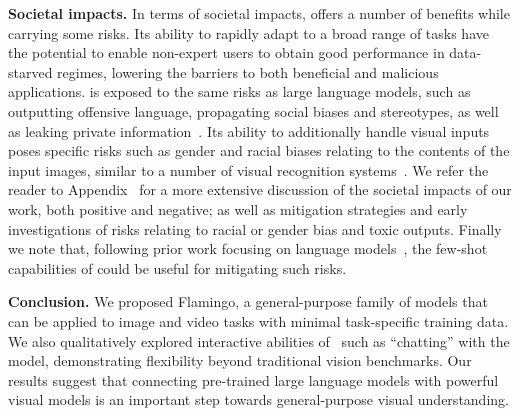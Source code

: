 \noindent
\textbf{Societal impacts.}
In terms of societal impacts, \largem{} offers a number of benefits while carrying some risks.
Its ability to rapidly adapt to a broad range of tasks have the potential to enable non-expert users to obtain
good
performance in data-starved regimes, lowering the barriers to both beneficial and malicious applications.
\largem{} is exposed to the same risks as large language models, such as outputting offensive language, propagating social biases and stereotypes, as well as leaking private information~\citep{weidinger2021harms,chinchilla}.
Its ability to additionally handle visual inputs poses specific risks such as gender and racial biases relating to the contents of the input images, similar to a number of visual recognition systems~\citep{hendricks2018women,zhao2021understanding,buolamwini2018gender,de2019does,schwemmer2020diagnosing}.
We refer the reader to Appendix~ for a more extensive discussion of the societal impacts of our work, both positive and negative;
as well as mitigation strategies and early investigations of risks relating to racial or gender bias and toxic outputs.
Finally we note that, following prior work focusing on language models~\citep{thoppilan2022lamda,perez2022red,menick2022teaching},
the few-shot capabilities of \method{} could be useful for mitigating such risks.

\noindent
\textbf{Conclusion.}
We proposed Flamingo, a general-purpose family of models that can be applied to image and video tasks with minimal task-specific training data.
We also qualitatively
explored interactive abilities of~\largem{} such as ``chatting'' with the model, demonstrating flexibility beyond traditional vision
benchmarks.
Our results suggest that connecting pre-trained large language models with powerful visual models is an important step towards general-purpose visual understanding.